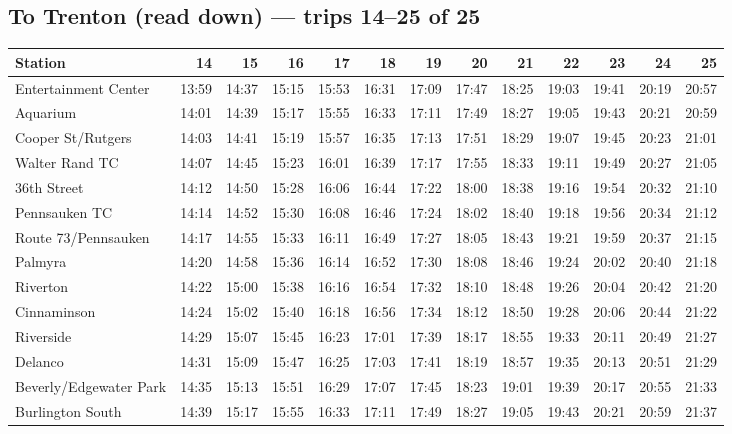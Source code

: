 \subsection*{To Trenton (read down) --- trips 14--25 of 25}
\begin{center}\footnotesize\setlength{\tabcolsep}{3pt}\begin{tabular}{@{}lrrrrrrrrrrrr@{}}\toprule
Station & 14 & 15 & 16 & 17 & 18 & 19 & 20 & 21 & 22 & 23 & 24 & 25 \\\midrule
Entertainment Center & 13:59 & 14:37 & 15:15 & 15:53 & 16:31 & 17:09 & 17:47 & 18:25 & 19:03 & 19:41 & 20:19 & 20:57 \\
Aquarium & 14:01 & 14:39 & 15:17 & 15:55 & 16:33 & 17:11 & 17:49 & 18:27 & 19:05 & 19:43 & 20:21 & 20:59 \\
Cooper St/Rutgers & 14:03 & 14:41 & 15:19 & 15:57 & 16:35 & 17:13 & 17:51 & 18:29 & 19:07 & 19:45 & 20:23 & 21:01 \\
Walter Rand TC & 14:07 & 14:45 & 15:23 & 16:01 & 16:39 & 17:17 & 17:55 & 18:33 & 19:11 & 19:49 & 20:27 & 21:05 \\
36th Street & 14:12 & 14:50 & 15:28 & 16:06 & 16:44 & 17:22 & 18:00 & 18:38 & 19:16 & 19:54 & 20:32 & 21:10 \\
Pennsauken TC & 14:14 & 14:52 & 15:30 & 16:08 & 16:46 & 17:24 & 18:02 & 18:40 & 19:18 & 19:56 & 20:34 & 21:12 \\
Route 73/Pennsauken & 14:17 & 14:55 & 15:33 & 16:11 & 16:49 & 17:27 & 18:05 & 18:43 & 19:21 & 19:59 & 20:37 & 21:15 \\
Palmyra & 14:20 & 14:58 & 15:36 & 16:14 & 16:52 & 17:30 & 18:08 & 18:46 & 19:24 & 20:02 & 20:40 & 21:18 \\
Riverton & 14:22 & 15:00 & 15:38 & 16:16 & 16:54 & 17:32 & 18:10 & 18:48 & 19:26 & 20:04 & 20:42 & 21:20 \\
Cinnaminson & 14:24 & 15:02 & 15:40 & 16:18 & 16:56 & 17:34 & 18:12 & 18:50 & 19:28 & 20:06 & 20:44 & 21:22 \\
Riverside & 14:29 & 15:07 & 15:45 & 16:23 & 17:01 & 17:39 & 18:17 & 18:55 & 19:33 & 20:11 & 20:49 & 21:27 \\
Delanco & 14:31 & 15:09 & 15:47 & 16:25 & 17:03 & 17:41 & 18:19 & 18:57 & 19:35 & 20:13 & 20:51 & 21:29 \\
Beverly/Edgewater Park & 14:35 & 15:13 & 15:51 & 16:29 & 17:07 & 17:45 & 18:23 & 19:01 & 19:39 & 20:17 & 20:55 & 21:33 \\
Burlington South & 14:39 & 15:17 & 15:55 & 16:33 & 17:11 & 17:49 & 18:27 & 19:05 & 19:43 & 20:21 & 20:59 & 21:37 \\

\end{tabular}
\end{center}

